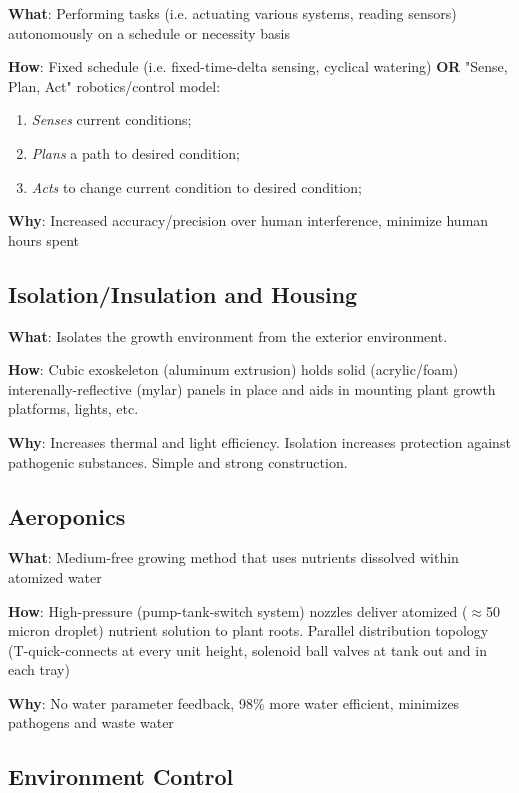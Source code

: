 \documentclass{report}
\begin{document}
\textbf{What}: Performing tasks (i.e. actuating various systems, reading sensors) autonomously on a schedule or necessity basis

\textbf{How}: Fixed schedule (i.e. fixed-time-delta sensing, cyclical watering) \textbf{OR} "Sense, Plan, Act" robotics/control model:
\begin{enumerate}
    \item \textit{Senses} current conditions;
    \item \textit{Plans} a path to desired condition;
    \item \textit{Acts} to change current condition to desired condition;
\end{enumerate}
\textbf{Why}: Increased accuracy/precision over human interference, minimize human hours spent

\subsection{Isolation/Insulation and Housing}
\label{sec:isolationinsulation}

\textbf{What}: Isolates the growth environment from the exterior environment. 

\textbf{How}: Cubic exoskeleton (aluminum extrusion) holds solid (acrylic/foam) interenally-reflective (mylar) panels in place and aids in mounting plant growth platforms, lights, etc.

\textbf{Why}: Increases thermal and light efficiency. Isolation increases protection against pathogenic substances. Simple and strong construction.

\subsection{Aeroponics}
\label{sec:aeroponics}

\textbf{What}: Medium-free growing method that uses nutrients dissolved within atomized water

\textbf{How}: High-pressure (pump-tank-switch system) nozzles deliver atomized ($\approx$50 micron droplet) nutrient solution to plant roots. Parallel distribution topology (T-quick-connects at every unit height, solenoid ball valves at tank out and in each tray)

\textbf{Why}: No water parameter feedback, 98\% more water efficient, minimizes pathogens and waste water

\newpage

\subsection{Environment Control}
\label{sec:environment}
\end{document}
